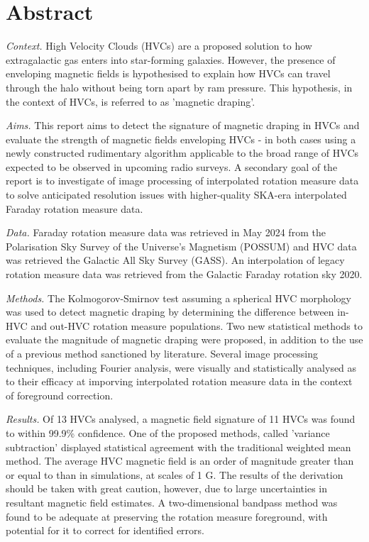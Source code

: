 \chapter*{Abstract}

\noindent\textit{Context.} High Velocity Clouds (HVCs) are a proposed solution to how extragalactic gas enters into star-forming galaxies. However, the presence of enveloping magnetic fields is hypothesised to explain how HVCs can travel through the halo without being torn apart by ram pressure. This hypothesis, in the context of HVCs, is referred to as 'magnetic draping'.

\noindent\textit{Aims.} This report aims to detect the signature of magnetic draping in HVCs and evaluate the strength of magnetic fields enveloping HVCs - in both cases using a newly constructed rudimentary algorithm applicable to the broad range of HVCs expected to be observed in upcoming radio surveys. A secondary goal of the report is to investigate of image processing of interpolated rotation measure data to solve anticipated resolution issues with higher-quality SKA-era interpolated Faraday rotation measure data.

\noindent\textit{Data.} Faraday rotation measure data was retrieved in May 2024 from the Polarisation Sky Survey of the Universe's Magnetism (POSSUM) and HVC data was retrieved the Galactic All Sky Survey (GASS). An interpolation of legacy rotation measure data was retrieved from the Galactic Faraday rotation sky 2020.

\noindent\textit{Methods.} The Kolmogorov-Smirnov test assuming a spherical HVC morphology was used to detect magnetic draping by determining the difference between in-HVC and out-HVC rotation measure populations. Two new statistical methods to evaluate the magnitude of magnetic draping were proposed, in addition to the use of a previous method sanctioned by literature. Several image processing techniques, including Fourier analysis, were visually and statistically analysed as to their efficacy at imporving interpolated rotation measure data in the context of foreground correction.

\noindent\textit{Results.} Of 13 HVCs analysed, a magnetic field signature of 11 HVCs was found to within 99.9\% confidence. One of the proposed methods, called 'variance subtraction' displayed statistical agreement with the traditional weighted mean method. The average HVC magnetic field is an order of magnitude greater than or equal to than in simulations, at scales of 1 \textmu G. The results of the derivation should be taken with great caution, however, due to large uncertainties in resultant magnetic field estimates. A two-dimensional bandpass method was found to be adequate at preserving the rotation measure foreground, with potential for it to correct for identified errors.

\newpage 

\ %

\newpage


